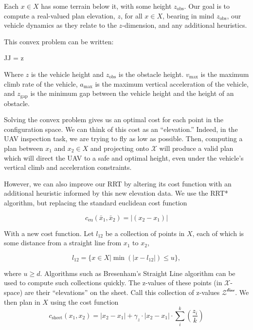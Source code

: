 \documentclass[letterpaper, 12pt]{article}
\begin{document}
Each $x \in X$ has some terrain below it, with some height $z_\text{obs}$. Our goal is to compute a real-valued plan elevation, $z$, for all $x \in X$, bearing in mind $z_\text{obs}$, our vehicle dynamics as they relate to the $z$-dimension, and any additional heuristics.

This convex problem can be written:

\begin{mini!}
    {J}{J = z}
    {\label{eq:Example1}}
    {}
\end{mini!}

Where $z$ is the vehicle height and $z_\text{obs}$ is the obstacle height. $v_\text{max}$ is the maximum climb rate of the vehicle, $a_\text{max}$ is the maximum vertical acceleration of the vehicle, and $z_\text{gap}$ is the minimum gap between the vehicle height and the height of an obstacle.

Solving the convex problem gives us an optimal cost for each point in the configuration space. We can think of this cost as an ``elevation.'' Indeed, in the UAV inspection task, we are trying to fly as low as possible. Then, computing a plan between $x_1$ and $x_2 \in X$ and projecting onto $\mathcal{X}$ will produce a valid plan which will direct the UAV to a safe and optimal height, even under the vehicle's vertical climb and acceleration constraints.


However, we can also improve our RRT by altering its cost function with an additional heuristic informed by this new elevation data. We use the RRT* algorithm, but replacing the standard euclidean cost function

\begin{equation}
c_\text{eu}(\bar{x}_1, \bar{x}_2) = |(x_2 - x_1)|
\end{equation}


With a new cost function. Let $l_{12}$ be a collection of points in $X$, each of which is some distance from a straight line from $x_1$ to $x_2$,

\begin{equation}
l_{12} = \{x \in X | \min(|x - l_{12}|) \leq u \},
\end{equation}

where $u \geq d$. Algorithms such as Bresenham's Straight Line algorithm can be used to compute such collections quickly. The z-values of these points (in $\mathcal{X}$-space) are their ``elevations'' on the sheet. Call this collection of z-values $\mathcal{Z^\text{line}}$. We then plan in $X$ using the cost function
\begin{equation}
c_\text{sheet}(x_1, x_2) = |x_2 - x_1| + \gamma_z \cdot |x_2 - x_1| \cdot \sum^k_i({\frac{z_i}{k}})
\end{equation}
\end{document}

